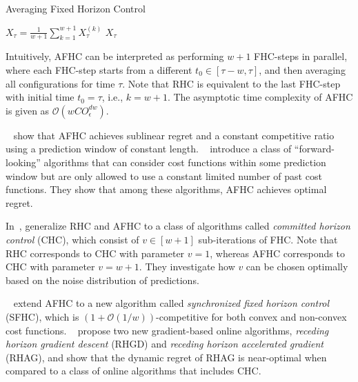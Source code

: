 \begin{algorithm}
    \caption{Averaging Fixed Horizon Control~\cite{Lin2012}}\label{alg:predictions:afhc}
    $X_{\tau} = \frac{1}{w+1} \sum_{k=1}^{w+1} X_{\tau}^{(k)}$\;
    \Return $X_{\tau}$\;
\end{algorithm}

Intuitively, AFHC can be interpreted as performing $w+1$ FHC-steps in parallel, where each FHC-step starts from a different $t_0 \in [\tau-w,\tau]$, and then averaging all configurations for time $\tau$. Note that RHC is equivalent to the last FHC-step with initial time $t_0 = \tau$, i.e., $k = w+1$. The asymptotic time complexity of AFHC is given as $\mathcal{O}(w C O_{\epsilon}^{dw})$.

\citeauthor{Chen2015}~\cite{Chen2015} show that AFHC achieves sublinear regret and a constant competitive ratio using a prediction window of constant length. \citeauthor{Badiei2015}~\cite{Badiei2015} introduce a class of ``forward-looking'' algorithms that can consider cost functions within some prediction window but are only allowed to use a constant limited number of past cost functions. They show that among these algorithms, AFHC achieves optimal regret.

In~\cite{Chen2016}, \citeauthor{Chen2016} generalize RHC and AFHC to a class of algorithms called \emph{committed horizon control} (CHC), which consist of $v \in [w+1]$ sub-iterations of FHC. Note that RHC corresponds to CHC with parameter $v = 1$, whereas AFHC corresponds to CHC with parameter $v = w+1$. They investigate how $v$ can be chosen optimally based on the noise distribution of predictions.

\citeauthor{Lin2019}~\cite{Lin2019} extend AFHC to a new algorithm called \emph{synchronized fixed horizon control} (SFHC), which is $(1 + \mathcal{O}(1/w))$-competitive for both convex and non-convex cost functions. \citeauthor{Li2018}~\cite{Li2018} propose two new gradient-based online algorithms, \emph{receding horizon gradient descent} (RHGD) and \emph{receding horizon accelerated gradient} (RHAG), and show that the dynamic regret of RHAG is near-optimal when compared to a class of online algorithms that includes CHC.

